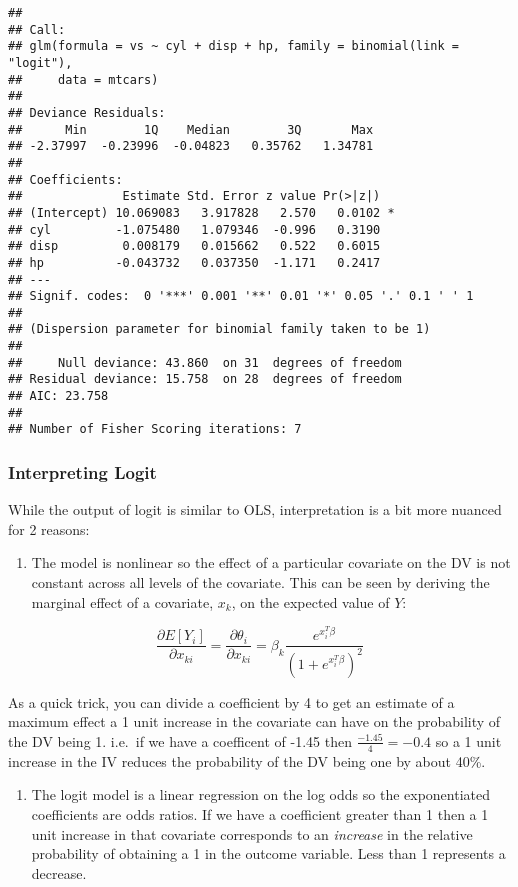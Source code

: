 \documentclass[
]{article}
\providecommand{\tightlist}{%
  \setlength{\itemsep}{0pt}\setlength{\parskip}{0pt}}
\begin{document}
\begin{verbatim}
## 
## Call:
## glm(formula = vs ~ cyl + disp + hp, family = binomial(link = "logit"), 
##     data = mtcars)
## 
## Deviance Residuals: 
##      Min        1Q    Median        3Q       Max  
## -2.37997  -0.23996  -0.04823   0.35762   1.34781  
## 
## Coefficients:
##              Estimate Std. Error z value Pr(>|z|)  
## (Intercept) 10.069083   3.917828   2.570   0.0102 *
## cyl         -1.075480   1.079346  -0.996   0.3190  
## disp         0.008179   0.015662   0.522   0.6015  
## hp          -0.043732   0.037350  -1.171   0.2417  
## ---
## Signif. codes:  0 '***' 0.001 '**' 0.01 '*' 0.05 '.' 0.1 ' ' 1
## 
## (Dispersion parameter for binomial family taken to be 1)
## 
##     Null deviance: 43.860  on 31  degrees of freedom
## Residual deviance: 15.758  on 28  degrees of freedom
## AIC: 23.758
## 
## Number of Fisher Scoring iterations: 7
\end{verbatim}

\hypertarget{interpreting-logit}{%
\subsubsection{Interpreting Logit}\label{interpreting-logit}}

While the output of logit is similar to OLS, interpretation is a bit
more nuanced for 2 reasons:

\begin{enumerate}
\def\labelenumi{\arabic{enumi}.}
\tightlist
\item
  The model is nonlinear so the effect of a particular covariate on the
  DV is not constant across all levels of the covariate. This can be
  seen by deriving the marginal effect of a covariate, \(x_k\), on the
  expected value of \(Y\):
\end{enumerate}

\[\frac{\partial E[Y_i]}{\partial x_{ki}}=\frac{\partial\theta_i}{\partial x_{ki}}=\beta_k\frac{e^{x_i^T\beta}}{(1+e^{x_i^T\beta})^2}\]

As a quick trick, you can divide a coefficient by 4 to get an estimate
of a maximum effect a 1 unit increase in the covariate can have on the
probability of the DV being 1. i.e.~if we have a coefficent of -1.45
then \(\frac{-1.45}{4}=-0.4\) so a 1 unit increase in the IV reduces the
probability of the DV being one by about 40\%.

\begin{enumerate}
\def\labelenumi{\arabic{enumi}.}
\setcounter{enumi}{1}
\tightlist
\item
  The logit model is a linear regression on the log odds so the
  exponentiated coefficients are odds ratios. If we have a coefficient
  greater than 1 then a 1 unit increase in that covariate corresponds to
  an \emph{increase} in the relative probability of obtaining a 1 in the
  outcome variable. Less than 1 represents a decrease.
\end{enumerate}
\end{document}
